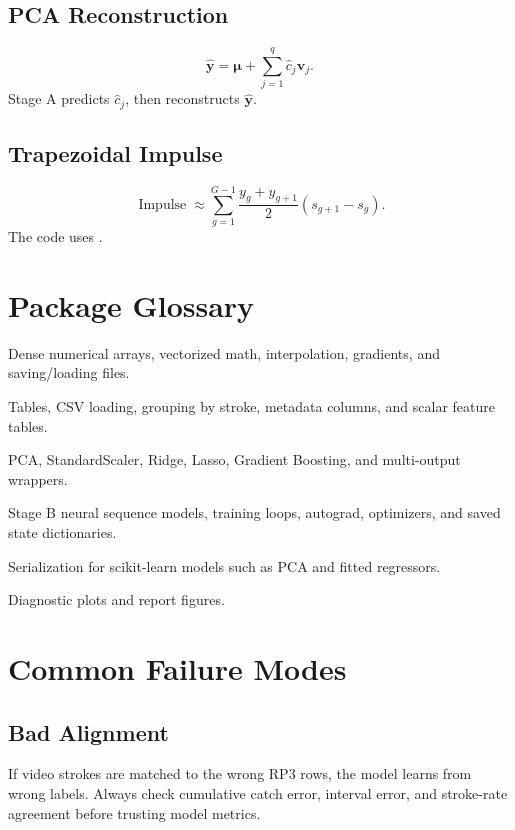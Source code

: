 \documentclass[11pt]{article}
\newcommand{\code}[1]{\texttt{\detokenize{#1}}}
\newcommand{\vect}[1]{\boldsymbol{#1}}
\begin{document}
\subsection{PCA Reconstruction}
\[
  \hat{\vect{y}}
  =
  \vect{\mu}
  +
  \sum_{j=1}^{q} \hat{c}_j \vect{v}_j.
\]
Stage A predicts \(\hat{c}_j\), then reconstructs \(\hat{\vect{y}}\).

\subsection{Trapezoidal Impulse}
\[
  \operatorname{Impulse}
  \approx
  \sum_{g=1}^{G-1}
  \frac{y_g+y_{g+1}}{2}(s_{g+1}-s_g).
\]
The code uses \code{np.trapz}.

\section{Package Glossary}

\begin{description}[leftmargin=0.28\linewidth, style=nextline]
  \item[\code{numpy}] Dense numerical arrays, vectorized math, interpolation,
  gradients, and saving/loading \code{.npy} files.
  \item[\code{pandas}] Tables, CSV loading, grouping by stroke, metadata
  columns, and scalar feature tables.
  \item[\code{scikit-learn}] PCA, StandardScaler, Ridge, Lasso, Gradient
  Boosting, and multi-output wrappers.
  \item[\code{PyTorch}] Stage B neural sequence models, training loops,
  autograd, optimizers, and saved state dictionaries.
  \item[\code{joblib}] Serialization for scikit-learn models such as PCA and
  fitted regressors.
  \item[\code{matplotlib}] Diagnostic plots and report figures.
\end{description}

\section{Common Failure Modes}

\subsection{Bad Alignment}
If video strokes are matched to the wrong RP3 rows, the model learns from wrong
labels. Always check cumulative catch error, interval error, and stroke-rate
agreement before trusting model metrics.
\end{document}
